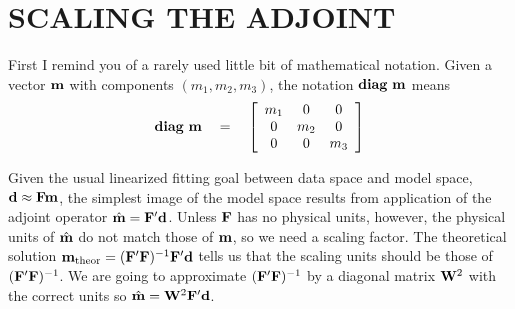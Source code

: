 
\section{SCALING THE ADJOINT}

First I remind you of a rarely used little bit of mathematical notation.
Given a vector $\bold m$ with components $(m_1,m_2,m_3)$,
the notation $ {\bf diag\ }\bold m$ means
\begin{equation}
 {\bf diag\ }\bold m \quad =\quad
	\left[
 	\begin{array}{ccc}
		m_1 &  0 & 0 
		\\
		0   &m_2 & 0
		\\
		0   &  0 & m_3
	\end{array}
	\right]
\end{equation}
\par
Given the usual linearized fitting goal between
data space and model space, $ \bold d \approx \bold F \bold m$,
the simplest image of the model space results from
application of the adjoint operator $ \hat{\bold m} = \bold F' \bold d$.
Unless $\bold F$ has no physical units, however,
the physical units of $\hat{\bold m}$ do not match those of $\bold m$,
so we need a scaling factor.
The theoretical solution
$\bold m_{\rm theor} = (\bold F'\bold F)^{-1}\bold F'\bold d$
tells us that the scaling units should be those of $(\bold F'\bold F)^{-1}$.
We are going to approximate $(\bold F'\bold F)^{-1}$ by a diagonal matrix
$\bold W^2$ with the correct units so
$\hat{\bold m} = \bold W^2 \bold F'\bold d$.

